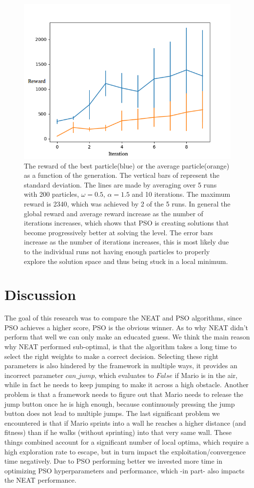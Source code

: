 \documentclass[]{article}
\begin{document}
\begin{figure}[h]
    \centering
    \includegraphics[width=0.75\linewidth]{images/avg_glb_gen.png}
    \caption{The reward of the best particle(blue) or the average particle(orange) as a function of the generation. The vertical bars of represent the standard deviation. The lines are made by averaging over 5 runs with 200 particles, $\omega = 0.5$, $\alpha = 1.5$ and 10 iterations. The maximum reward is 2340, which was achieved by 2 of the 5 runs. In general the global reward and average reward increase as the number of iterations increases, which shows that PSO is creating solutions that become progressively better at solving the level. The error bars increase as the number of iterations increases, this is most likely due to the individual runs not having enough particles to properly explore the solution space and thus being stuck in a local minimum.}
    \label{fig:generation_pso}
\end{figure}


\section{Discussion}
\label{sec:discussion}
The goal of this research was to compare the NEAT and PSO algorithms, since PSO achieves a higher score, PSO is the obvious winner. As to why NEAT didn't perform that well we can only make an educated guess. We think the main reason why NEAT performed sub-optimal, is that the algorithm takes a long time to select the right weights to make a correct decision. Selecting these right parameters is also hindered by the framework in multiple ways, it provides an incorrect parameter $can\_jump$, which evaluates to $False$ if Mario is in the air, while in fact he needs to keep jumping to make it across a high obstacle. Another problem is that a framework needs to figure out that Mario needs to release the jump button once he is high enough, because continuously pressing the jump button does not lead to multiple jumps. The last significant problem we encountered is that if Mario sprints into a wall he reaches a higher distance (and fitness) than if he walks (without sprinting) into that very same wall. These things combined account for a significant number of local optima, which require a high exploration rate to escape, but in turn impact the exploitation/convergence time negatively. Due to PSO performing better we invested more time in optimizing PSO hyperparameters and performance, which -in part- also impacts the NEAT performance.
\newpage
\end{document}
